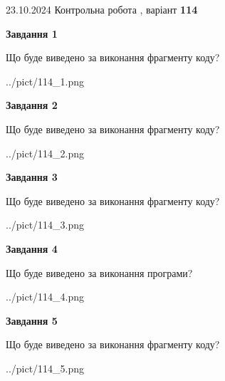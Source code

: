 \documentclass[12pt, ukrainian]{article}
\begin{document}
{\Large{23.10.2024 Контрольна робота , варіант  \No \textbf { 114 }\par}}
{
\begin {large}
{\begin {center}\textbf{Завдання 1}\end {center}}

Що буде виведено за виконання фрагменту коду?\par
\begin{center}
	{../pict/114_1.png}
\end{center}
\newpage

{\begin {center}\textbf{Завдання 2}\end {center}}

Що буде виведено за виконання фрагменту коду?\par
\begin{center}
	{../pict/114_2.png}
\end{center}
\newpage

{\begin {center}\textbf{Завдання 3}\end {center}}

Що буде виведено за виконання фрагменту коду?\par
\begin{center}
	{../pict/114_3.png}
\end{center}
\newpage

{\begin {center}\textbf{Завдання 4}\end {center}}

Що буде виведено за виконання програми?\par
\begin{center}
	{../pict/114_4.png}
\end{center}
\newpage

{\begin {center}\textbf{Завдання 5}\end {center}}

Що буде виведено за виконання фрагменту коду?\par
\begin{center}
	{../pict/114_5.png}
\end{center}
\newpage


\end{large}}
\end{document}
